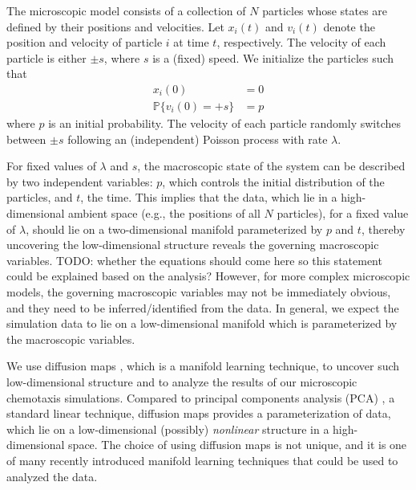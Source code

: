 \documentclass[prl, reprint, final, showkeys]{revtex4-1}
\begin{document}
The microscopic model consists of a collection of $N$ particles whose states are defined by their positions and velocities. 
%
Let $x_i(t)$ and $v_i(t)$ denote the position and velocity of particle $i$ at time $t$, respectively.
%
The velocity of each particle is either $\pm s$, where $s$ is a (fixed) speed. 
%
We initialize the particles such that
\begin{equation}\label{eqn:system}
\begin{aligned}
x_i(0) & = 0 \\
\mathbb{P} \{ v_i(0) = +s \} & = p
\end{aligned}
\end{equation}
where $p$ is an initial probability.
%
The velocity of each particle randomly switches between $\pm s$ following an (independent) Poisson process with rate $\lambda$.
%


For fixed values of $\lambda$ and $s$, the macroscopic state of the system can be described by two independent variables: $p$, which controls the initial distribution of the particles, and $t$, the time. 
%
This implies that the data, which lie in a high-dimensional ambient space (e.g., the positions of all $N$ particles), for a fixed value of $\lambda$, should lie on a two-dimensional manifold parameterized by $p$ and $t$, 
thereby uncovering the low-dimensional structure reveals the governing macroscopic variables.
%
TODO: whether the equations should come here so this statement could be explained based on the analysis?
%
However, for more complex microscopic models, the governing macroscopic variables may not be immediately obvious, and they need to be inferred/identified from the data.
%
In general, we expect the simulation data to lie on a low-dimensional manifold which is parameterized by the macroscopic variables.

We use diffusion maps \cite{coifman2005geometric}, which is a manifold learning technique, to uncover such low-dimensional structure and to analyze the results of our microscopic chemotaxis simulations.
%
Compared to principal components analysis (PCA) \cite{...}, a standard linear technique, diffusion maps provides a parameterization of data, which lie on a low-dimensional (possibly) {\em nonlinear} structure in a high-dimensional space.
%
The choice of using diffusion maps is not unique, and it is one of many recently introduced manifold learning techniques that could be used to analyzed the data.
\end{document}
